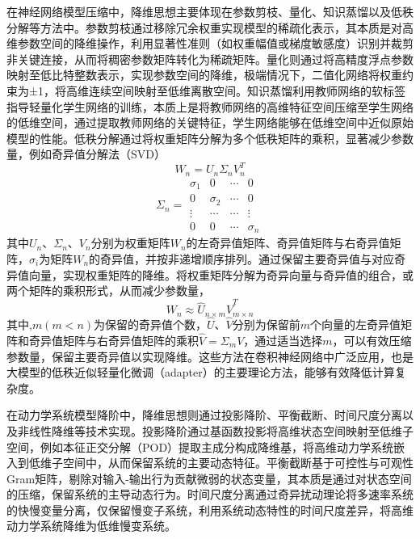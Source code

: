 在神经网络模型压缩中，降维思想主要体现在参数剪枝\cite{liuFilterPruningQuantifying2023}、量化\cite{jacobQuantizationTrainingNeural2018}、知识蒸馏\cite{hintonDistillingKnowledgeNeural2015}以及低秩分解\cite{hanDeepCompressionCompressing2016}等方法中。参数剪枝通过移除冗余权重实现模型的稀疏化表示，其本质是对高维参数空间的降维操作，利用显著性准则（如权重幅值或梯度敏感度）识别并裁剪非关键连接，从而将稠密参数矩阵转化为稀疏矩阵。量化则通过将高精度浮点参数映射至低比特整数表示，实现参数空间的降维，极端情况下，二值化网络将权重约束为±1，将高维连续空间映射至低维离散空间。知识蒸馏利用教师网络的软标签指导轻量化学生网络的训练，本质上是将教师网络的高维特征空间压缩至学生网络的低维空间，通过提取教师网络的关键特征，学生网络能够在低维空间中近似原始模型的性能。低秩分解通过将权重矩阵分解为多个低秩矩阵的乘积，显著减少参数量，例如奇异值分解法（SVD）
\begin{equation}
  \label{eq:svd}
  W_n = U_n\Sigma_n {V_n^T}
\end{equation}
\begin{equation}
  \label{eq:Sigma}
{\Sigma_n} = \begin{array}{*{20}{c}}
  {{\sigma _1}}&0& \cdots &0\\
  0&{{\sigma _2}}& \cdots &0\\
   \vdots & \cdots & \cdots & \vdots \\
  0&0& \cdots &{{\sigma _n}}
  \end{array}
\end{equation}
其中$U_n$、$\Sigma_n$、$V_n$分别为权重矩阵$W_n$的左奇异值矩阵、奇异值矩阵与右奇异值矩阵，$\sigma_i$为矩阵$W_n$的奇异值，并按非递增顺序排列。通过保留主要奇异值与对应奇异值向量，实现权重矩阵的降维。将权重矩阵分解为奇异向量与奇异值的组合，或两个矩阵的乘积形式，从而减少参数量，
\begin{equation}
  \label{eq:lowrank}
  W_n \approx {\hat{U}_{n\times m}}{\hat{V}_{m\times n}^T}
\end{equation}
其中,$m(m<n)$为保留的奇异值个数，$\hat{U}$、$\hat{V}$分别为保留前$m$个向量的左奇异值矩阵和奇异值矩阵与右奇异值矩阵的乘积$\hat{V}=\Sigma_mV$，通过适当选择$m$，可以有效压缩参数量，保留主要奇异值以实现降维。这些方法在卷积神经网络中广泛应用，也是大模型的低秩近似轻量化微调（adapter）\cite{houlsbyParameterefficientTransferLearning2019}的主要理论方法，能够有效降低计算复杂度。

在动力学系统模型降阶中，降维思想则通过投影降阶、平衡截断、时间尺度分离以及非线性降维等技术实现。投影降阶通过基函数投影将高维状态空间映射至低维子空间，例如本征正交分解（POD）提取主成分构成降维基，将高维动力学系统嵌入到低维子空间中，从而保留系统的主要动态特征。平衡截断基于可控性与可观性Gram矩阵，剔除对输入-输出行为贡献微弱的状态变量，其本质是通过对状态空间的压缩，保留系统的主导动态行为。时间尺度分离通过奇异扰动理论将多速率系统的快慢变量分离，仅保留慢变子系统，利用系统动态特性的时间尺度差异，将高维动力学系统降维为低维慢变系统。

